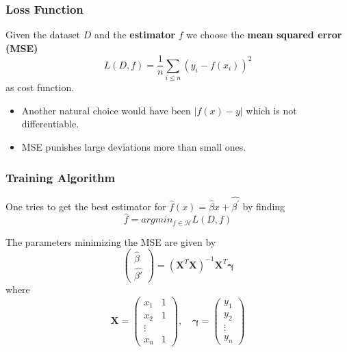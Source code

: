 \subsubsection{Loss Function}
Given the dataset $D$ and the \textbf{estimator} $f$ we choose the \textbf{mean squared error (MSE)}
\begin{equation*}
    L(D,f)=\frac{1}{n}\sum_{i\leq n}{\left(y_i-f(x_i)\right)}^2
\end{equation*}
as cost function.


\begin{itemize}
    \item Another natural choice would have been $|f(x)-y|$ which is not differentiable.
    \item MSE punishes large deviations more than small ones.
\end{itemize}

\subsubsection{Training Algorithm}
One tries to get the best estimator for $\hat{f}(x)=\hat{\beta}x+\widehat{\beta^{\prime}}$ by finding
\begin{equation*}
    \hat{f}=argmin_{f\in\mathcal{H}}L(D,f)
\end{equation*}


The parameters minimizing the MSE are given by
\begin{equation*}
    \begin{pmatrix}
        \hat{\beta} \\
        \widehat{\beta'}
    \end{pmatrix}
    ={(\mathbf{X}^T \mathbf{X})}^{-1}\mathbf{X}^T\mathbf{\gamma}
\end{equation*}
where
\begin{equation*}
    \mathbf{X}=
    \begin{pmatrix}
        x_1 & 1 \\
        x_2 & 1 \\
        \vdots  \\
        x_n & 1
    \end{pmatrix},\quad
    \mathbf{\gamma}=
    \begin{pmatrix}
        y_1    \\
        y_2    \\
        \vdots \\
        y_n
    \end{pmatrix}
\end{equation*}

